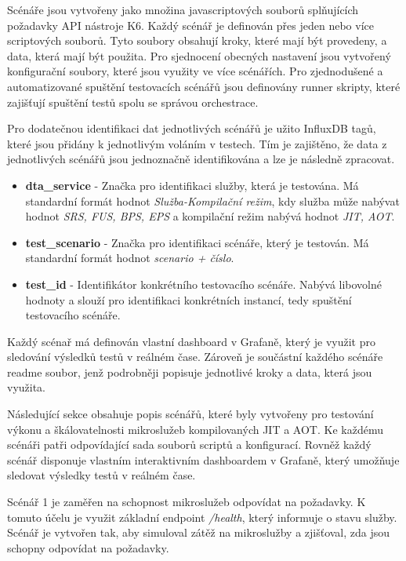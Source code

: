 
Scénáře jsou vytvořeny jako množina javascriptových souborů splňujících požadavky API nástroje K6. Každý scénář je definován přes jeden nebo více scriptových souborů. Tyto soubory obsahují kroky, které mají být provedeny, a data, která mají být použita. Pro sjednocení obecných nastavení jsou vytvořený konfigurační soubory, které jsou využity ve více scénářích. Pro zjednodušené a automatizované spuštění testovacích scénářů jsou definovány runner skripty, které zajišťují spuštění testů spolu se správou orchestrace.

Pro dodatečnou identifikaci dat jednotlivých scénářů je užito InfluxDB tagů, které jsou přidány k jednotlivým voláním v testech. Tím je zajištěno, že data z jednotlivých scénářů jsou jednoznačně identifikována a lze je následně zpracovat. 

\begin{itemize}
    \item \textbf{dta\_service} - Značka pro identifikaci služby, která je testována. Má standardní formát hodnot \emph{Služba-Kompilační režim}, kdy služba může nabývat hodnot \emph{SRS, FUS, BPS, EPS} a kompilační režim nabývá hodnot \emph{JIT, AOT}.
    \item \textbf{test\_scenario} - Značka pro identifikaci scénáře, který je testován. Má standardní formát hodnot \emph{scenario 
    + číslo}.
    \item \textbf{test\_id} - Identifikátor konkrétního testovacího scénáře. Nabývá libovolné hodnoty a slouží pro identifikaci konkrétních instancí, tedy spuštění testovacího scénáře.
\end{itemize}

Každý scénař má definován vlastní dashboard v Grafaně, který je využit pro sledování výsledků testů v reálném čase. Zároveň je součástní každého scénáře readme soubor, jenž podrobněji popisuje jednotlivé kroky a data, která jsou využita.


Následující sekce obsahuje popis scénářů, které byly vytvořeny pro testování výkonu a škálovatelnosti mikroslužeb kompilovaných JIT a AOT. Ke každému scénáři patři odpovídající sada souborů scriptů a konfigurací. Rovněž každý scénář disponuje vlastním interaktivním dashboardem v Grafaně, který umožňuje sledovat výsledky testů v reálném čase.


Scénář 1 je zaměřen na schopnost mikroslužeb odpovídat na požadavky. K tomuto účelu je využit základní endpoint \emph{/health}, který informuje o stavu služby. Scénář je vytvořen tak, aby simuloval zátěž na mikroslužby a zjišťoval, zda jsou schopny odpovídat na požadavky.

